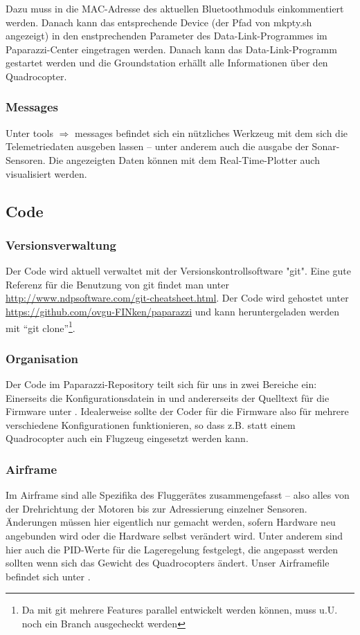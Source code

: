 Dazu muss in  die MAC-Adresse des aktuellen Bluetoothmoduls einkommentiert werden.
Danach kann das entsprechende Device (der Pfad von mkpty.sh angezeigt) in den enstprechenden Parameter des Data-Link-Programmes im Paparazzi-Center eingetragen werden.
Danach kann das Data-Link-Programm gestartet werden und die Groundstation erhällt alle Informationen über den Quadrocopter.

\subsubsection{Messages}
Unter tools $\Rightarrow$ messages befindet sich ein nützliches Werkzeug mit dem sich die Telemetriedaten ausgeben lassen – unter anderem auch die ausgabe der Sonar-Sensoren.
Die angezeigten Daten können mit dem Real-Time-Plotter auch visualisiert werden.



\subsection{Code}

\subsubsection*{Versionsverwaltung}
Der Code wird aktuell verwaltet mit der Versionskontrollsoftware "git". 
Eine gute Referenz für die Benutzung von git findet man unter \url{http://www.ndpsoftware.com/git-cheatsheet.html}.
Der Code wird gehostet unter \url{https://github.com/ovgu-FINken/paparazzi} und kann heruntergeladen werden mit \enquote{git clone}\footnote{Da mit git mehrere Features parallel entwickelt werden können, muss u.U. noch ein Branch ausgecheckt werden}.

\subsubsection*{Organisation}

Der Code im Paparazzi-Repository teilt sich für uns in zwei Bereiche ein: Einerseits die Konfigurationsdatein in  und andererseits der Quelltext für die Firmware unter .
Idealerweise sollte der Coder für die Firmware also für mehrere verschiedene Konfigurationen funktionieren, so dass z.B. statt einem Quadrocopter auch ein Flugzeug eingesetzt werden kann.


\subsubsection*{Airframe}
Im Airframe sind alle Spezifika des Fluggerätes zusammengefasst – also alles von der Drehrichtung der Motoren bis zur Adressierung einzelner Sensoren.
Änderungen müssen hier eigentlich nur gemacht werden, sofern Hardware neu angebunden wird oder die Hardware selbst verändert wird.
Unter anderem sind hier auch die PID-Werte für die Lageregelung festgelegt, die angepasst werden sollten wenn sich das Gewicht des Quadrocopters ändert.
Unser Airframefile befindet sich unter .


